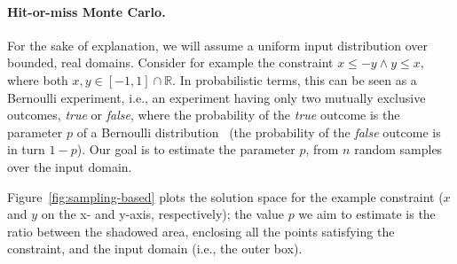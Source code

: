 \paragraph{Hit-or-miss Monte Carlo.}
For the sake of explanation, we will assume a uniform input distribution over bounded, real domains. Consider for example the constraint $x \leq -y \land y \leq x$, where both $x, y \in [-1, 1] \cap \mathbb{R}$. In probabilistic terms, this can be seen as a Bernoulli experiment, i.e., an experiment having only two mutually exclusive outcomes, \textit{true} or \textit{false}, where the probability of the \textit{true} outcome is the parameter $p$ of a Bernoulli distribution~\cite{pestman1998mathematical} (the probability of the \textit{false} outcome is in turn $1-p$). Our goal is to estimate the parameter $p$, from $n$ random samples over the input domain.

Figure~\ref{fig:sampling-based} plots the solution space for the example constraint ($x$ and $y$ on the x- and y-axis, respectively); the value $p$ we aim to estimate is the ratio between the shadowed area, enclosing all the points satisfying the constraint, and the input domain (i.e., the outer box).

